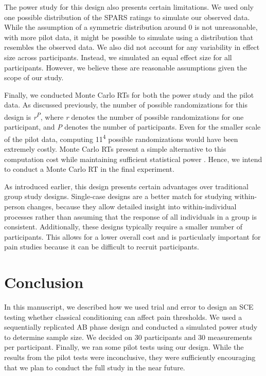 \documentclass{article}
\begin{document}
The power study for this design also presents certain limitations. We used only one possible distribution of the SPARS ratings to simulate our observed data. While the assumption of a symmetric distribution around 0 is not unreasonable, with more pilot data, it might be possible to simulate using a distribution that resembles the observed data. We also did not account for any variability in effect size across participants. Instead, we simulated an equal effect size for all participants. However, we believe these are reasonable assumptions given the scope of our study. 

Finally, we conducted Monte Carlo RTs for both the power study and the pilot data. As discussed previously, the number of possible randomizations for this design is \emph{r}\textsuperscript{\emph{P}}, where \emph{r} denotes the number of possible randomizations for one participant, and \emph{P} denotes the number of participants. Even for the smaller scale of the pilot data, computing 11\textsuperscript{4} possible randomizations would have been extremely costly. Monte Carlo RTs present a simple alternative to this computation cost while maintaining sufficient statistical power \autocite{bib49} \autocite{bib50}. Hence, we intend to conduct a Monte Carlo RT in the final experiment.

As introduced earlier, this design presents certain advantages over traditional group study designs. Single-case designs are a better match for studying within-person changes, because they allow detailed insight into within-individual processes rather than assuming that the response of all individuals in a group is consistent. Additionally, these designs typically require a smaller number of participants. This allows for a lower overall cost and is particularly important for pain studies because it can be difficult to recruit participants.

\section{Conclusion} 

In this manuscript, we described how we used trial and error to design an SCE testing whether classical conditioning can affect pain thresholds. We used a sequentially replicated AB phase design and conducted a simulated power study to determine sample size. We decided on 30 participants and 30 measurements per participant. Finally, we ran some pilot tests using our design. While the results from the pilot tests were inconclusive, they were sufficiently encouraging that we plan to conduct the full study in the near future.
\end{document}
